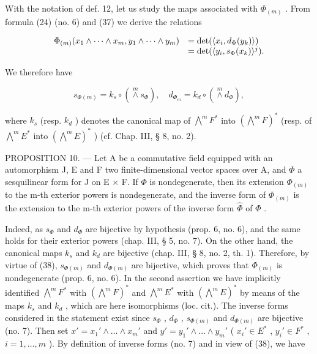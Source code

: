 With the notation of def. 12, let us study the maps associated with \(\Phi_{(m)}\) . From formula (24) (no. 6) and (37) we derive the relations

\[
\begin{array}{r l} \Phi_ {(m)} (x _ {1} \wedge \dots \wedge x _ {m}, y _ {1} \wedge \dots \wedge y _ {m}) & = \det (\langle x _ {i}, d _ {\Phi} (y _ {k}) \rangle) \\ & = \det (\langle y _ {i}, s _ {\Phi} (x _ {k}) \rangle^ {j}). \end{array}
\]

We therefore have

\[
s _ {\Phi (m)} = k _ {s} \circ (\stackrel {m} {\wedge} s _ {\Phi}), \quad d _ {\Phi_ {m}} = k _ {d} \circ (\stackrel {m} {\wedge} d _ {\Phi}),\tag{38}
\]

where \(k_s\) (resp. \(k_d\) ) denotes the canonical map of \(\bigwedge^m F^*\) into \((\bigwedge^m F)^*\) (resp. of \(\bigwedge^m E^*\) into \((\bigwedge^m E)^*\) ) (cf. Chap. III, § 8, no. 2).

PROPOSITION 10. --- Let A be a commutative field equipped with an automorphism J, E and F two finite-dimensional vector spaces over A, and \(\Phi\) a sesquilinear form for J on E \(\times\) F. If \(\Phi\) is nondegenerate, then its extension \(\Phi_{(m)}\) to the m-th exterior powers is nondegenerate, and the inverse form of \(\Phi_{(m)}\) is the extension to the m-th exterior powers of the inverse form \(\hat{\Phi}\) of \(\Phi\) .

Indeed, as \(s_{\Phi}\) and \(d_{\Phi}\) are bijective by hypothesis (prop. 6, no. 6), and the same holds for their exterior powers (chap. III, § 5, no. 7). On the other hand, the canonical maps \(k_s\) and \(k_d\) are bijective (chap. III, § 8, no. 2, th. 1). Therefore, by virtue of (38), \(s_{\Phi(m)}\) and \(d_{\Phi(m)}\) are bijective, which proves that \(\Phi_{(m)}\) is nondegenerate (prop. 6, no. 6). In the second assertion we have implicitly identified \(\bigwedge^m F^*\) with \((\bigwedge^m F)^*\) and \(\bigwedge^m E^*\) with \((\bigwedge^m E)^*\) by means of the maps \(k_s\) and \(k_d\) , which are here isomorphisms (loc. cit.). The inverse forms considered in the statement exist since \(s_{\Phi}\) , \(d_{\Phi}\) , \(s_{\Phi(m)}\) and \(d_{\Phi(m)}\) are bijective (no. 7). Then set \(x' = x_1' \wedge \ldots \wedge x_m'\) and \(y' = y_1' \wedge \ldots \wedge y_m'\) ( \(x_i' \in E^*\) , \(y_i' \in F^*\) , \(i = 1, \ldots, m\) ). By definition of inverse forms (no. 7) and in view of (38), we have

